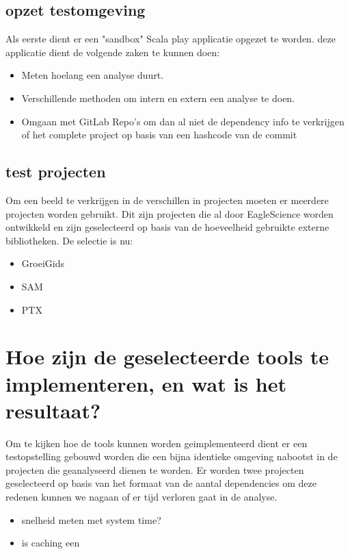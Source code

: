 \subsection{opzet testomgeving}\label{subsec:opzet-testomgeving}
Als eerste dient er een "sandbox" Scala play applicatie opgezet te worden. deze applicatie dient de volgende zaken te kunnen doen:
\begin{itemize}
    \item Meten hoelang een analyse duurt.
    \item Verschillende methoden om intern en extern een analyse te doen.
    \item Omgaan met GitLab Repo's om dan al niet de dependency info te verkrijgen of het complete project op basis van een hashcode van de commit
\end{itemize}

\subsection{}

\subsection{test projecten}
Om een beeld te verkrijgen in de verschillen in projecten moeten er meerdere projecten worden gebruikt. Dit zijn projecten die al door EagleScience worden ontwikkeld en zijn geselecteerd op basis van de hoeveelheid gebruikte externe bibliotheken.
De selectie is nu:
\begin{itemize}
    \item GroeiGids
    \item SAM
    \item PTX
\end{itemize}


\section{Hoe zijn de geselecteerde tools te implementeren, en wat is het resultaat?}
Om te kijken hoe de tools kunnen worden geimplementeerd dient er een testopstelling gebouwd worden die een bijna identieke omgeving nabootst in de projecten die geanalyseerd dienen te worden. Er worden twee projecten geselecteerd op basis van het formaat van de aantal dependencies om deze redenen kunnen we nagaan of er tijd verloren gaat in de analyse.



\begin{itemize}
    \item snelheid meten met system time?
    \item is caching een
\end{itemize}

